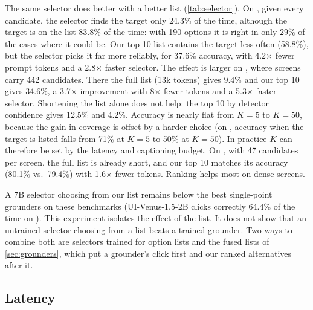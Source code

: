 The same selector does better with a better list (\cref{tab:selector}). On \osw, given every candidate, the
selector finds the target only 24.3\% of the time, although the target is on the list 83.8\% of the time: with 190
options it is right in only 29\% of the cases where it could be. Our top-10 list contains the target less often
(58.8\%), but the selector picks it far more reliably, for 37.6\% accuracy, with 4.2$\times$ fewer prompt tokens
and a 2.8$\times$ faster selector. The effect is larger on \sspro, where screens carry 442 candidates. There the
full list (13k tokens) gives 9.4\% and our top 10 gives 34.6\%, a 3.7$\times$ improvement with 8$\times$ fewer
tokens and a 5.3$\times$ faster selector. Shortening the list alone does not help: the top 10 by detector
confidence gives 12.5\% and 4.2\%. Accuracy is nearly flat from $K{=}5$ to $K{=}50$, because the gain in coverage is
offset by a harder choice (on \osw, accuracy when the target is listed falls from 71\% at $K{=}5$ to 50\% at
$K{=}50$). In practice $K$ can therefore be set by the latency and captioning budget. On \ssv, with 47 candidates
per screen, the full list is already short, and our top 10 matches its accuracy (80.1\% vs.\ 79.4\%) with
1.6$\times$ fewer tokens. Ranking helps most on dense screens.

A 7B selector choosing from our list remains below the best single-point grounders on these benchmarks
(UI-Venus-1.5-2B clicks correctly 64.4\% of the time on \osw). This experiment isolates the effect of the list. It
does not show that an untrained selector choosing from a list beats a trained grounder. Two ways to combine both
are selectors trained for option lists and the fused lists of \cref{sec:grounders}, which put a grounder's click
first and our ranked alternatives after it.

\subsection{Latency}
\label{sec:speed}

